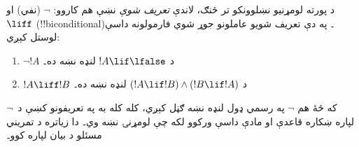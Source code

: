\documentclass[../../../include/open-logic-section]{subfiles}
\begin{document}
د پورته لومړنيو نښلوونکو تر څنګ، لاندې \emph{تعريف شوې} نښې هم
کاروو: $\lnot$ (نفي) او $\liff$ (!!{biconditional})۔ په دې تعريف
شويو عاملونو جوړ شوي فارمولونه داسې لوستل کېږي:
\begin{enumerate}
\item $\lnot !A$ د $!A \lif \lfalse$ لنډه نښه ده۔

\item $!A \liff !B$ د $(!A \lif !B) \land (!B
  \lif !A)$ لنډه نښه ده۔
\end{enumerate}

که څۀ هم $\lnot$ په رسمي ډول لنډه نښه ګڼل کېږي، کله کله به په
تعريفونو کښې د~$\lnot$ لپاره ښکاره قاعدې او مادې داسې ورکوو لکه
چې لومړنۍ نښه وي۔ دا زياتره د تمريني مسئلو د بيان لپاره کوو۔
\end{document}
